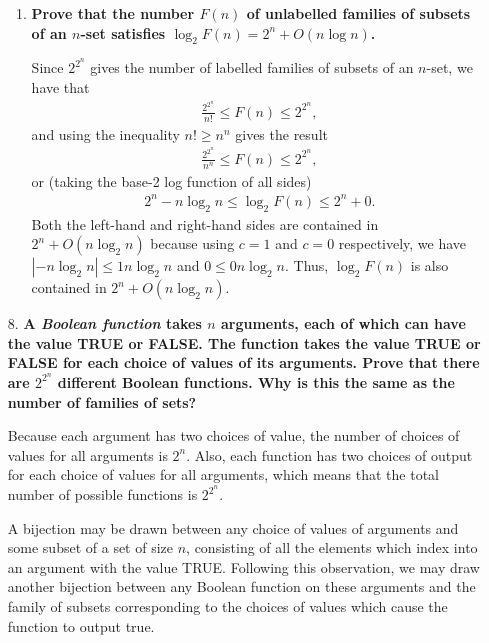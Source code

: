 \documentclass[a4paper,12pt]{article}
\begin{document}
\begin{enumerate}
\begin{enumerate}
            \item
                \boldmath
                \textbf{Prove that the number $F(n)$ of unlabelled families of subsets of an $n$-set satisfies $\log_2 F(n) = 2^n + O(n\log n)$.} \par
                \unboldmath
                Since $2^{2^n}$ gives the number of labelled families of subsets of an $n$-set, we have that
                \begin{align*}
                    \frac{2^{2^n}}{n!} \leq F(n) \leq 2^{2^n},
                \end{align*}
                and using the inequality $n! \geq n^n$ gives the result
                \begin{align*}
                    \frac{2^{2^n}}{n^n} \leq F(n) \leq 2^{2^n},
                \end{align*}
                or (taking the base-2 log function of all sides)
                \begin{align*}
                    2^n - n\log_2 n \leq \log_2 F(n) \leq 2^n + 0.
                \end{align*}
                Both the left-hand and right-hand sides are contained in $2^n + O(n\log_2 n)$ because using $c = 1$ and $c = 0$ respectively, we have $|{-n}\log_2 n| \leq 1n\log_2 n$ and $0 \leq 0n\log_2 n$. Thus, $\log_2 F(n)$ is also contained in $2^n + O(n \log_2 n)$.
        \end{enumerate}

    \item[8.]
        \boldmath
        \textbf{A \textit{Boolean function} takes $n$ arguments, each of which can have the value TRUE or FALSE. The function takes the value TRUE or FALSE for each choice of values of its arguments. Prove that there are $2^{2^n}$ different Boolean functions. Why is this the same as the number of families of sets?} \par
        \unboldmath
        Because each argument has two choices of value, the number of choices of values for all arguments is $2^n$. Also, each function has two choices of output for each choice of values for all arguments, which means that the total number of possible functions is $2^{2^n}$. \par
        A bijection may be drawn between any choice of values of arguments and some subset of a set of size $n$, consisting of all the elements which index into an argument with the value TRUE. Following this observation, we may draw another bijection between any Boolean function on these arguments and the family of subsets corresponding to the choices of values which cause the function to output true.


\end{enumerate}
\end{document}
